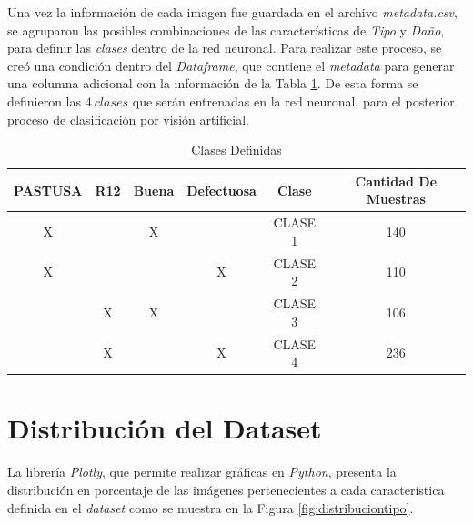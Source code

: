 Una vez la información de cada imagen fue guardada en el archivo \textit{metadata.csv}, se agruparon las posibles combinaciones de las características de \textit{Tipo} y \textit{Daño}, para definir las \textit{clases} dentro de la red neuronal. Para realizar este proceso, se creó una condición dentro del \textit{Dataframe}, que contiene el \textit{metadata} para generar una columna adicional con la información de la Tabla \ref{table:Clases}. De esta forma se definieron las $4 \ clases$ que serán entrenadas en la red neuronal, para el posterior proceso de clasificación por visión artificial. \\	

\newpage
\begin{table}[ht]
	\centering
	\begin{tabular}{|c|c|c|c|c|c|}
		\hline
		PASTUSA & R12 & Buena & Defectuosa & Clase & Cantidad De Muestras\\
		\hline
		X &  & X &  & CLASE 1 & 140\\
		\hline
		X &  &  & X & CLASE 2 & 110\\
		\hline
		& X & X &  & CLASE 3 & 106\\
		\hline
		& X &  & X & CLASE 4 & 236\\
		\hline
	\end{tabular}	
	\caption{Clases Definidas}
	\label{table:Clases}
\end{table}	

\section{Distribución del Dataset}

La librería \textit{Plotly}, que permite realizar gráficas en \textit{Python}, presenta la distribución en porcentaje de las imágenes pertenecientes a cada característica definida en el \textit{dataset} como se muestra en la Figura \ref{fig:distribuciontipo}.\\


